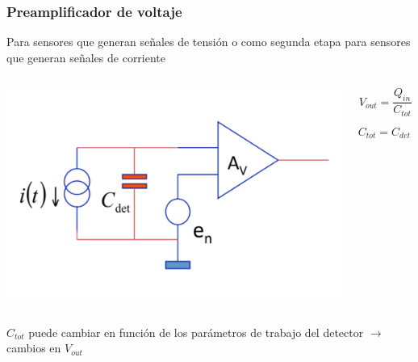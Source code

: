 \documentclass{beamer}
\begin{document}
\begin{frame}
\frametitle{Preamplificador de voltaje}
\begin{block}{}
Para sensores que generan señales de tensión o como segunda etapa para sensores
que generan señales de corriente
\end{block}
\begin{columns}
\begin{column}{0.5\textwidth}
\includegraphics[width=\textwidth]{d2/voltage_preamplifier}
\end{column}
\begin{column}{0.5\textwidth}
$$V_{out} = \frac{Q_{in}}{C_{tot}}$$

$$C_{tot} = C_{det} + C_{conn} + C_{in\_pre}$$
\end{column}
\end{columns}
\begin{block}{}
\alert{$C_{tot}$} puede cambiar en función de los parámetros de trabajo del detector
$\rightarrow$ cambios en \alert{$V_{out}$}
\end{block}
\end{frame}
\end{document}
